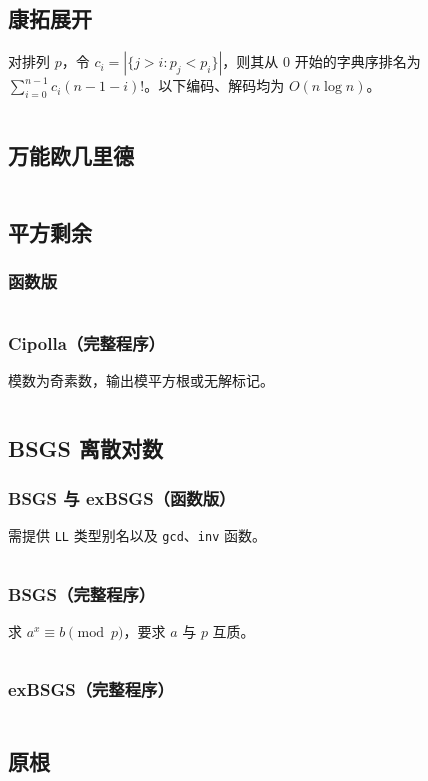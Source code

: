 				\subsection{康拓展开}
					对排列 $p$，令 $c_i=|\{j>i:p_j<p_i\}|$，则其从 $0$ 开始的字典序排名为
					$\sum_{i=0}^{n-1}c_i(n-1-i)!$。以下编码、解码均为 $O(n\log n)$。
					\inputminted{cpp}{sections/NumberTheory/assets/Math/CantorExpansion.cpp}
				\subsection{万能欧几里德}
					\inputminted{cpp}{sections/NumberTheory/assets/zjj/euclid.cpp}
				\subsection{平方剩余}
					\subsubsection{函数版}
					\inputminted{cpp}{sections/NumberTheory/assets/Math/平方剩余.cpp}
					\subsubsection{Cipolla（完整程序）}
					模数为奇素数，输出模平方根或无解标记。
					\inputminted{cpp}{sections/NumberTheory/assets/Math/二次剩余.cpp}
				\subsection{BSGS 离散对数}
					\subsubsection{BSGS 与 exBSGS（函数版）}
					需提供 \texttt{LL} 类型别名以及 \texttt{gcd}、\texttt{inv} 函数。
					\inputminted{cpp}{sections/NumberTheory/assets/Math/BSGS.cpp}
					\subsubsection{BSGS（完整程序）}
					求 $a^x\equiv b\pmod p$，要求 $a$ 与 $p$ 互质。
					\inputminted{cpp}{sections/NumberTheory/assets/Math/BSGS-独立程序.cpp}
					\subsubsection{exBSGS（完整程序）}
					\inputminted{cpp}{sections/NumberTheory/assets/Math/exBSGS.cpp}
				\subsection{原根}
					\inputminted{cpp}{sections/NumberTheory/assets/Math/原根.cpp}
					
